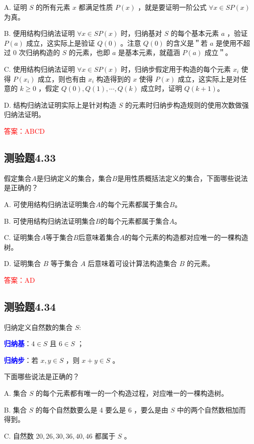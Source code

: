 \documentclass[UTF8, heading=true]{ctexart}
\begin{document}
A. 证明 $S$ 的所有元素 $x$ 都满足性质 $P(x)$ ，就是要证明一阶公式 $\forall x \in S P(x)$ 为真。

B. 便用结构归纳法证明 $\forall x \in S P(x)$ 时，归纳基对 $S$ 的每个基本元素 $a$ ，验证 $P(a)$ 成立，这实际上是验证 $Q(0)$ 。注意 $Q(0)$ 的含义是＂若 $a$ 是使用不超过 0 次归纳构造的 $S$ 的元素，也即 $a$ 是基本元素，就蕴涵 $P(a)$ 成立＂。

C. 使用结构归纳法证明 $\forall x \in S P(x)$ 时，归纳步假定用于构造的每个元素 $x_i$ 使得 $P\left(x_i\right)$ 成立，则也有由 $x_i$ 构造得到的 $x$ 使得 $P(x)$ 成立，这实际上是对任意的 $k \geq 0$ ，假定 $Q(0), Q(1), \cdots, Q(k)$ 成立时，证明 $Q(k+1)$。

D. 结构归纳法证明实际上是针对构造 $S$ 的元素时归纳步构造规则的使用次数做强归纳法证明。

\textcolor{red}{答案：ABCD}

\subsection{测验题4.33}

假定集合$A$是归纳定义的集合，集合$B$是用性质概括法定义的集合，下面哪些说法是正确的？

A. 
可使用结构归纳法证明集合$A$的每个元素都属于集合$B$。

B. 
可使用结构归纳法证明集合$B$的每个元素都属于集合$A$。

C. 
证明集合$A$等于集合$B$后意味着集合$A$的每个元素的构造都对应唯一的一棵构造树。

D. 
证明集合 $B$ 等于集合 $A$ 后意味着可设计算法构造集合 $B$ 的元素。

\textcolor{red}{答案：AD}

\subsection{测验题4.34}

归纳定义自然数的集合 $S:$ 

\textcolor{blue}{\textbf{归纳基}}：$4 \in S$ 且 $6 \in S$ ；

\textcolor{blue}{\textbf{归纳步}}：若 $x, y \in S$ ，则 $x+y \in S$ 。

下面哪些说法是正确的？

A. 集合 $S$ 的每个元素都有唯一的一个构造过程，对应唯一的一棵构造树。

B. 集合 $S$ 的每个自然数要么是 4 要么是 6 ，要么是由 $S$ 中的两个自然数相加而得到。

C. 自然数 $20,26,30,36,40,46$ 都属于 $S$ 。
\end{document}
